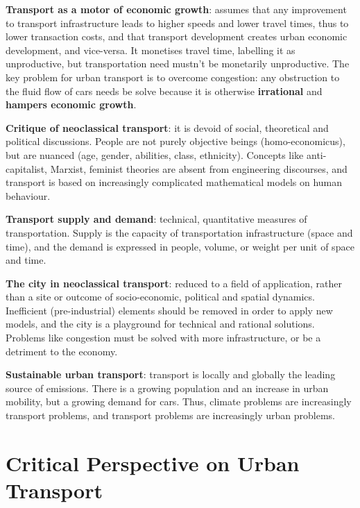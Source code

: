 \documentclass{article}
\newcommand{\alignedmarginpar}[1]{%
        \marginpar{\raggedright\small #1}
    }
\begin{document}
\textbf{Transport as a motor of economic growth}: assumes that any improvement to transport infrastructure leads to higher speeds and lower travel times, thus to lower transaction costs, and that transport development creates urban economic development, and vice-versa. It monetises travel time, labelling it as unproductive, but transportation need mustn't be monetarily unproductive.\alignedmarginpar{Cycling for leisure}The key problem for urban transport is to overcome congestion: any obstruction to the fluid flow of cars needs be solve because it is otherwise \textbf{irrational} and \textbf{hampers economic growth}.

\textbf{Critique of neoclassical transport}: it is devoid of social, theoretical and political discussions. People are not purely objective beings (homo-economicus), but are nuanced (age, gender, abilities, class, ethnicity). Concepts like anti-capitalist, Marxist, feminist theories are absent from engineering discourses, and transport is based on increasingly complicated mathematical models on human behaviour.

\textbf{Transport supply and demand}: technical, quantitative measures of transportation. Supply is the capacity of transportation infrastructure (space and time), and the demand is expressed in people, volume, or weight per unit of space and time.

\textbf{The city in neoclassical transport}: reduced to a field of application, rather than a site or outcome of socio-economic, political and spatial dynamics. Inefficient (pre-industrial) elements should be removed in order to apply new models, and the city is a playground for technical and rational solutions. Problems like congestion must be solved with more infrastructure, or be a detriment to the economy.

\textbf{Sustainable urban transport}: transport is locally and globally the leading source of emissions. There is a growing population and an increase in urban mobility, but a growing demand for cars. Thus, climate problems are increasingly transport problems, and transport problems are increasingly urban problems.

\pagebreak\section{Critical Perspective on Urban Transport}

\textbf{}

\textbf{}

\textbf{}

\textbf{}

\textbf{}

\textbf{}

\textbf{}

\textbf{}

\textbf{}
\end{document}
